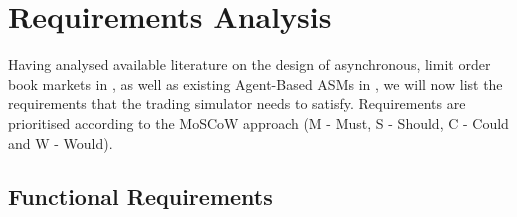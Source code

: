 \FloatBarrier
\section{Requirements Analysis}
\label{Chapters/Analysis-and-Design/Requirements-Analysis}

Having analysed available literature on the design of asynchronous, limit order book markets in , as well as existing Agent-Based ASMs in , we will now list the requirements that the trading simulator needs to satisfy. Requirements are prioritised according to the MoSCoW approach (M - Must, S - Should, C - Could and W - Would).

\subsection{Functional Requirements}
